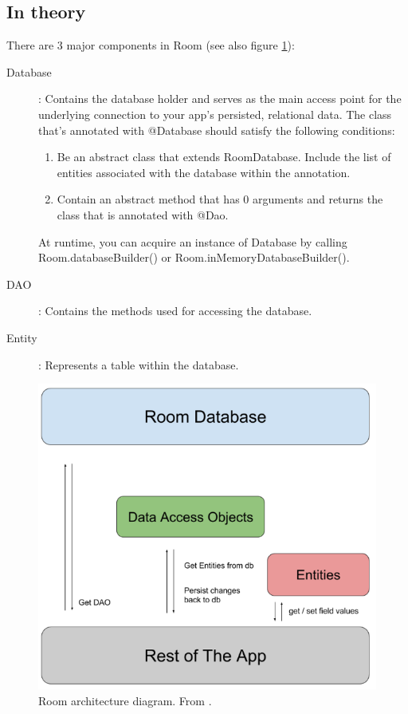 \subsection{In theory}
There are 3 major components in Room \cite{RoomDevAndroid} (see also figure \ref{fig:roomarchitecture}):
\begin{description}
	\item[Database]: Contains the database holder and serves as the main access point for the underlying connection to your app's persisted, relational data.
	The class that's annotated with @Database should satisfy the following conditions:
	\begin{enumerate}
		\item Be an abstract class that extends RoomDatabase.
		Include the list of entities associated with the database within the annotation.
		\item Contain an abstract method that has 0 arguments and returns the class that is annotated with @Dao.
	\end{enumerate}
 	At runtime, you can acquire an instance of Database by calling Room.databaseBuilder() or Room.inMemoryDatabaseBuilder().
	\item [DAO]: Contains the methods used for accessing the database.
	\item [Entity]: Represents a table within the database.
\end{description}

\begin{figure}
	\centering
	\includegraphics[width=0.7\linewidth]{images/persistency/room_architecture}
	\caption{Room architecture diagram. From \cite{RoomDevAndroid}.}
	\label{fig:roomarchitecture}
\end{figure}


